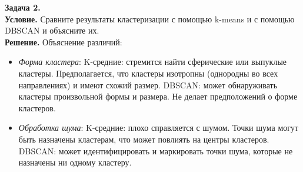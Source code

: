\begin{minipage}{.5\textwidth}
    \textbf{Задача 2.}\\
    \textbf{Условие.}
    Сравните результаты кластеризации с помощью k-means и с помощью DBSCAN и объясните их.\\
    \textbf{Решение.}
    Объяснение различий:
    \begin{itemize}
        \item \textit{Форма кластера}:
              K-средние: стремится найти сферические или выпуклые кластеры. Предполагается, что кластеры изотропны (однородны во всех направлениях) и имеют схожий размер.
              DBSCAN: может обнаруживать кластеры произвольной формы и размера. Не делает предположений о форме кластеров.
        \item \textit{Обработка шума}:
              K-средние: плохо справляется с шумом. Точки шума могут быть назначены кластерам, что может повлиять на центры кластеров.
              DBSCAN: может идентифицировать и маркировать точки шума, которые не назначены ни одному кластеру.
    \end{itemize}
\end{minipage}%
